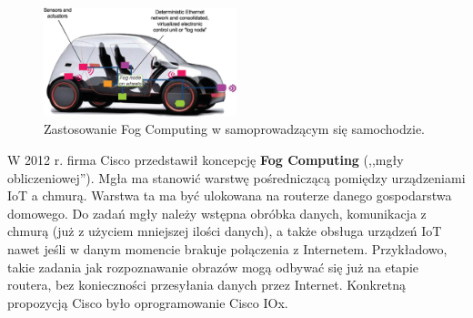 \documentclass[12pt,a4paper,twoside,titlepage,openright]{book}
\begin{document}
\begin{figure}[h]
	\centering
			\includegraphics[width=0.5\textwidth]{fog-samochod.png}
		\caption{Zastosowanie Fog Computing w samoprowadzącym się samochodzie. \cite{fog5g}}
		\label{fig:fog-samochod}
\end{figure}

W 2012 r. firma Cisco przedstawił koncepcję \textbf{Fog Computing} (,,mgły obliczeniowej''). Mgła ma stanowić warstwę pośredniczącą pomiędzy urządzeniami IoT a chmurą. Warstwa ta ma być ulokowana na routerze danego gospodarstwa domowego. Do zadań mgły należy wstępna obróbka danych, komunikacja z chmurą (już z użyciem mniejszej ilości danych), a także obsługa urządzeń IoT nawet jeśli w danym momencie brakuje połączenia z Internetem. Przykładowo, takie zadania jak rozpoznawanie obrazów mogą odbywać się już na etapie routera, bez konieczności przesyłania danych przez Internet. Konkretną propozycją Cisco było oprogramowanie Cisco IOx. \cite{fogArticle, iotArchitects}
\end{document}
